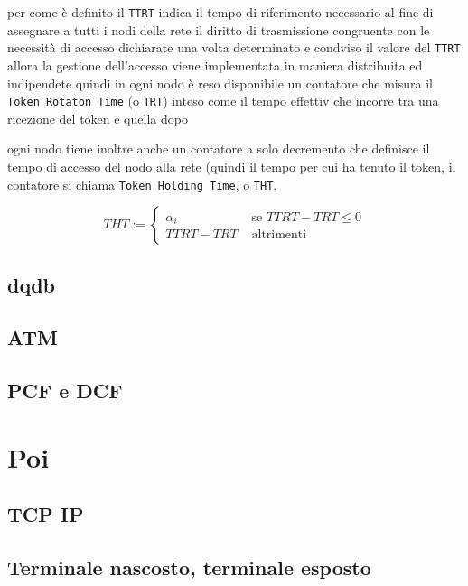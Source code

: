 \documentclass[11pt]{article}
\begin{document}
per come è definito il \texttt{TTRT} indica il tempo di riferimento necessario al fine di assegnare a tutti i nodi della rete il diritto di trasmissione congruente con le necessità di accesso dichiarate
una volta determinato e condviso il valore del \texttt{TTRT} allora la gestione dell'accesso viene implementata in maniera distribuita ed indipendete
quindi in ogni nodo è reso disponibile un contatore che misura il \texttt{Token Rotaton Time} (o \texttt{TRT}) inteso come il tempo effettiv che incorre tra una ricezione del token e quella dopo

ogni nodo tiene inoltre anche un contatore a solo decremento che definisce il tempo di accesso del nodo alla rete (quindi il tempo per cui ha tenuto il token, il contatore si chiama \texttt{Token Holding Time}, o \texttt{THT}.

\[ THT := \begin{cases} \alpha _i & \text{ se } TTRT - TRT \leq 0 \\ TTRT-TRT & \text{ altrimenti } \end{cases} \]



\subsection{dqdb}
\label{sec:orgf75642a}
\subsection{ATM}
\label{sec:org3be1d3a}
\subsection{PCF e DCF}
\label{sec:orga094067}

\section{Poi}
\label{sec:org5a42899}
\subsection{TCP IP}
\label{sec:org3711004}
\subsection{Terminale nascosto, terminale esposto}
\label{sec:org8ecf2b3}
\end{document}
